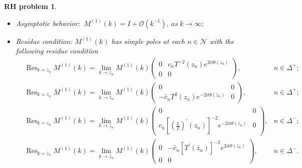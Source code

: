 \documentclass[11pt]{article}
\numberwithin{equation}{section}
\newtheorem{RHP}{RH problem}
\DeclareMathOperator*{\res}{Res}
\begin{document}
\begin{RHP}
\begin{itemize}
  \item Asymptotic behavior:
  $\ M^{(1)}(k)=I+\mathcal{O}(k^{-1}),\ as \ k\to \infty;$
\item Residue condition: $M^{(1)}(k)$ has simple poles at each $n\in\mathcal{N}$ with the following residue condition
\begin{align}
 &\res_{k=z_n} M^{(1)}(k)=\lim _{k \rightarrow z_n} M^{(1)}(k)\left(\begin{array}{cc}
0 & c_nT^{-2}\left(z_n\right) e^{2 i t \theta(z_n)} \\
0 & 0
\end{array}\right), &n \in \Delta^+; \label{res1}\\
 &\res_{k=\bar{z}_n} M^{(1)}(k)=\lim _{k \rightarrow \bar{z}_n} M^{(1)}(k)\left(\begin{array}{cc}
0 & 0 \\
-\bar{c}_n T^2\left(z_n\right) e^{-2 it\theta(\bar{z}_n)} & 0
\end{array}\right), &n \in \Delta^+; \\
&\res_{k=z_n} M^{(1)}(k)=\lim _{k \rightarrow z_n} M^{(1)}(k)\left(\begin{array}{cc}
0 & 0 \\
c_n\left[\left(\frac{1}{T}\right)^{\prime}\left(z_n\right)\right]^{-2} e^{-2 i t \theta(z_n)} & 0
\end{array}\right), &n \in \Delta^-; \\
&\res_{k=\bar{z}_n} M^{(1)}(k)=\lim_{k \rightarrow \bar{z}_n} M^{(1)}(k)\left(\begin{array}{cc}
0 & -\bar{c}_n \left[T^{\prime}\left(\bar{z}_n\right)\right]^{-2} e^{2 i t \theta(\bar{z}_n)} \\
0 & 0
\end{array}\right), &n \in\Delta^-.  \label{res4}
\end{align}
\end{itemize}
\end{RHP}
\end{document}
